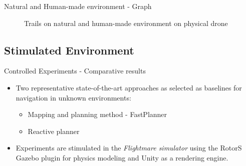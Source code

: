 \documentclass{beamer}
\begin{document}
\begin{frame}{Natural and Human-made environment - Graph }
	\begin{figure}
		\caption{Trails on natural and human-made environment on physical drone}
	\end{figure}
\end{frame}

\subsection{Stimulated Environment}
\begin{frame}{Controlled Experiments - Comparative results}
	\begin{itemize}
		\item Two representative state-of-the-art approaches as selected as baselines for navigation in unknown environments: 
		\begin{itemize}
			\item Mapping and planning method - FastPlanner \autocite{fastPlanner}
			\item Reactive planner \autocite{reactive_method}
		\end{itemize}
	
		\item Experiments are stimulated in the \textit{Flightmare simulator} using the RotorS Gazebo plugin for physics modeling and Unity as a rendering engine.
		
	\end{itemize}
\end{frame}
\end{document}
